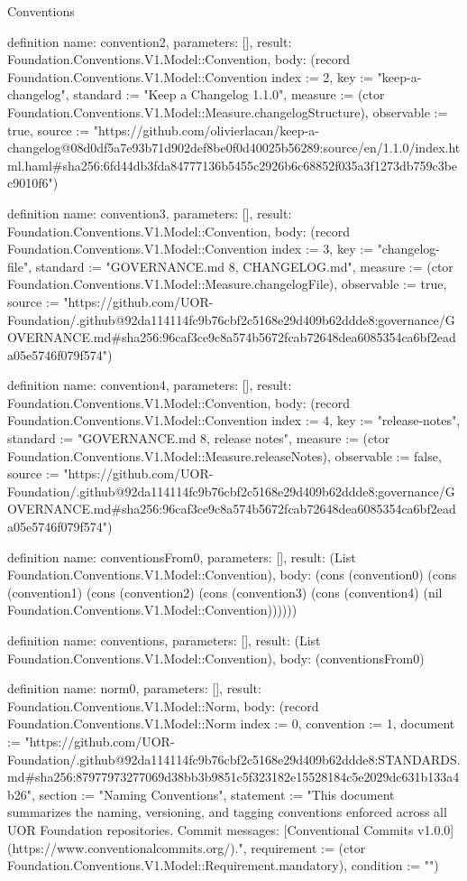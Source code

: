 \begin{lexlean}{Conventions}
\begin{semanticmodule}
definition{
  name: convention2,
  parameters: [],
  result: Foundation.Conventions.V1.Model::Convention,
  body: (record Foundation.Conventions.V1.Model::Convention {index := 2, key := "keep-a-changelog", standard := "Keep a Changelog 1.1.0", measure := (ctor Foundation.Conventions.V1.Model::Measure.changelogStructure), observable := true, source := "https://github.com/olivierlacan/keep-a-changelog@08d0df5a7e93b71d902def8be0f0d40025b56289:source/en/1.1.0/index.html.haml#sha256:6fd44db3fda84777136b5455c2926b6c68852f035a3f1273db759c3bec9010f6"})
}

definition{
  name: convention3,
  parameters: [],
  result: Foundation.Conventions.V1.Model::Convention,
  body: (record Foundation.Conventions.V1.Model::Convention {index := 3, key := "changelog-file", standard := "GOVERNANCE.md 8, CHANGELOG.md", measure := (ctor Foundation.Conventions.V1.Model::Measure.changelogFile), observable := true, source := "https://github.com/UOR-Foundation/.github@92da114114fc9b76cbf2c5168e29d409b62ddde8:governance/GOVERNANCE.md#sha256:96caf3ce9c8a574b5672fcab72648dea6085354ca6bf2eada05e5746f079f574"})
}

definition{
  name: convention4,
  parameters: [],
  result: Foundation.Conventions.V1.Model::Convention,
  body: (record Foundation.Conventions.V1.Model::Convention {index := 4, key := "release-notes", standard := "GOVERNANCE.md 8, release notes", measure := (ctor Foundation.Conventions.V1.Model::Measure.releaseNotes), observable := false, source := "https://github.com/UOR-Foundation/.github@92da114114fc9b76cbf2c5168e29d409b62ddde8:governance/GOVERNANCE.md#sha256:96caf3ce9c8a574b5672fcab72648dea6085354ca6bf2eada05e5746f079f574"})
}

definition{
  name: conventionsFrom0,
  parameters: [],
  result: (List Foundation.Conventions.V1.Model::Convention),
  body: (cons (convention0) (cons (convention1) (cons (convention2) (cons (convention3) (cons (convention4) (nil Foundation.Conventions.V1.Model::Convention))))))
}

definition{
  name: conventions,
  parameters: [],
  result: (List Foundation.Conventions.V1.Model::Convention),
  body: (conventionsFrom0)
}

definition{
  name: norm0,
  parameters: [],
  result: Foundation.Conventions.V1.Model::Norm,
  body: (record Foundation.Conventions.V1.Model::Norm {index := 0, convention := 1, document := "https://github.com/UOR-Foundation/.github@92da114114fc9b76cbf2c5168e29d409b62ddde8:STANDARDS.md#sha256:87977973277069d38bb3b9851c5f323182e15528184c5e2029dc631b133a4b26", section := "Naming Conventions", statement := "This document summarizes the naming, versioning, and tagging conventions enforced across all UOR Foundation repositories. Commit messages: [Conventional Commits v1.0.0](https://www.conventionalcommits.org/).", requirement := (ctor Foundation.Conventions.V1.Model::Requirement.mandatory), condition := ""})
}


\end{semanticmodule}
\end{lexlean}
